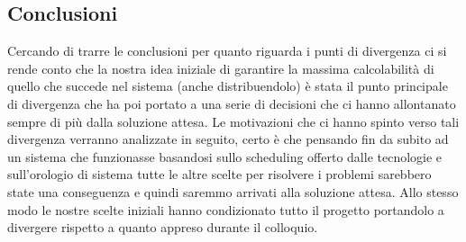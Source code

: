 \subsection{Conclusioni}
Cercando di trarre le conclusioni per quanto riguarda i punti di divergenza ci si rende conto che la nostra idea iniziale di garantire la massima calcolabilità di quello che succede nel sistema (anche distribuendolo) è stata il punto principale di divergenza che ha poi portato a una serie di decisioni che ci hanno allontanato sempre di più dalla soluzione attesa. Le motivazioni che ci hanno spinto verso tali divergenza verranno analizzate in seguito, certo è che pensando fin da subito ad un sistema che funzionasse basandosi sullo scheduling offerto dalle tecnologie e sull'orologio di sistema tutte le altre scelte per risolvere i problemi sarebbero state una conseguenza e quindi saremmo arrivati alla soluzione attesa. Allo stesso modo le nostre scelte iniziali hanno condizionato tutto il progetto portandolo a divergere rispetto a quanto appreso durante il colloquio.